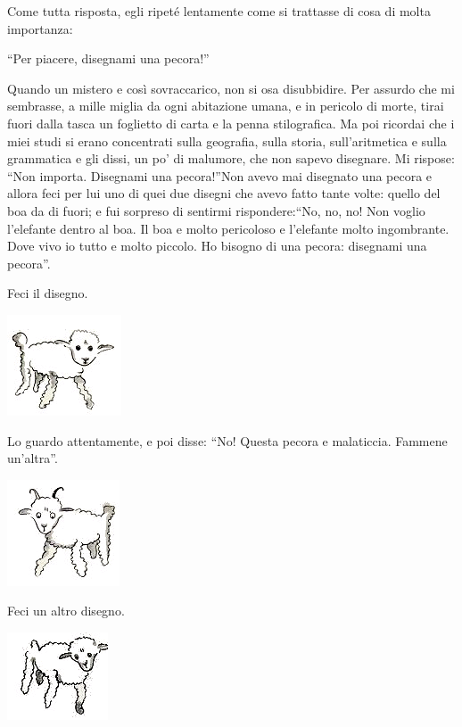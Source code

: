 \documentclass[11pt]{scrbook}
\begin{document}
Come tutta risposta, egli ripeté lentamente come si trattasse di cosa di
molta importanza:

``Per piacere, disegnami una pecora!''

Quando un mistero e così sovraccarico, non si osa disubbidire. Per
assurdo che mi sembrasse, a mille miglia da ogni abitazione umana, e in
pericolo di morte, tirai fuori dalla tasca un foglietto di carta e la
penna stilografica. Ma poi ricordai che i miei studi si erano
concentrati sulla geografia, sulla storia, sull'aritmetica e sulla
grammatica e gli dissi, un po' di malumore, che non sapevo disegnare. Mi
rispose: ``Non importa. Disegnami una pecora!''Non avevo mai disegnato
una pecora e allora feci per lui uno di quei due disegni che avevo fatto
tante volte: quello del boa da di fuori; e fui sorpreso di sentirmi
rispondere:``No, no, no! Non voglio l'elefante dentro al boa. Il boa e
molto pericoloso e l'elefante molto ingombrante. Dove vivo io tutto e
molto piccolo. Ho bisogno di una pecora: disegnami una pecora''.

Feci il disegno.

\begin{center}
\includegraphics{img/2b}
\end{center}

Lo guardo attentamente, e poi disse: ``No! Questa pecora e malaticcia.
Fammene un'altra''.

\begin{center}
\includegraphics{img/2c}
\end{center}

Feci un altro disegno.

\begin{center}
\includegraphics{img/2d}
\end{center}
\end{document}
